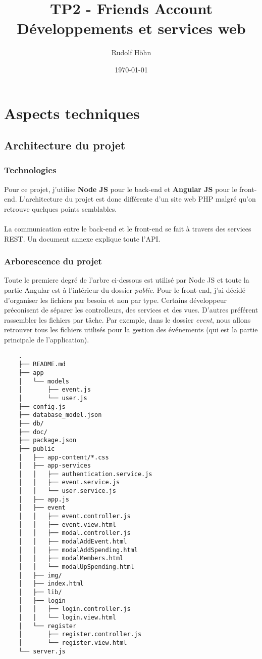 \documentclass[a4paper]{report}
\title{TP2 - Friends Account\\Développements et services web}
\author{Rudolf Höhn}
\date{\today}
\begin{document}
\maketitle

\tableofcontents

\chapter{Aspects techniques}
\section{Architecture du projet}
\subsection{Technologies}
Pour ce projet, j'utilise \textbf{Node JS} pour le back-end et \textbf{Angular JS} pour le front-end.
L'architecture du projet est donc différente d'un site web PHP malgré qu'on retrouve quelques points semblables.\\\\
La communication entre le back-end et le front-end se fait à travers des services REST. Un document annexe explique toute l'API.
\subsection{Arborescence du projet}
Toute le premiere degré de l'arbre ci-dessous est utilisé par Node JS et toute la partie Angular est à l'intérieur du dossier \textit{public}.
Pour le front-end, j'ai décidé d'organiser les fichiers par besoin et non par type. Certains développeur préconisent de séparer les controlleurs, des services et des vues.
D'autres préférent rassembler les fichiers par tâche. Par exemple, dans le dossier \textit{event}, nous allons retrouver tous les fichiers utilisés pour la gestion des événements (qui est la partie principale de l'application).
\begin{verbatim}
    .
    ├── README.md
    ├── app
    │   └── models
    │       ├── event.js
    │       └── user.js
    ├── config.js
    ├── database_model.json
    ├── db/
    ├── doc/
    ├── package.json
    ├── public
    │   ├── app-content/*.css
    │   ├── app-services
    │   │   ├── authentication.service.js
    │   │   ├── event.service.js
    │   │   └── user.service.js
    │   ├── app.js
    │   ├── event
    │   │   ├── event.controller.js
    │   │   ├── event.view.html
    │   │   ├── modal.controller.js
    │   │   ├── modalAddEvent.html
    │   │   ├── modalAddSpending.html
    │   │   ├── modalMembers.html
    │   │   └── modalUpSpending.html
    │   ├── img/
    │   ├── index.html
    │   ├── lib/
    │   ├── login
    │   │   ├── login.controller.js
    │   │   └── login.view.html
    │   └── register
    │       ├── register.controller.js
    │       └── register.view.html
    └── server.js
\end{verbatim}
\end{document}
